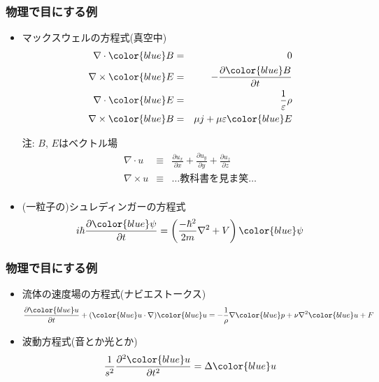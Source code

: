 \documentclass[12pt,dvipdfmx]{beamer}
\newcommand{\ao}[1]{{\color{blue}#1}}
\begin{document}
\begin{frame}
\frametitle{物理で目にする例}
\begin{itemize}
\item マックスウェルの方程式(真空中)
  \begin{eqnarray*}
    \nabla \cdot \ao{B} & = & 0 \\
    \nabla \times \ao{E} & = & -\frac{\partial \ao{B}}{\partial t} \\
    \nabla \cdot \ao{E} & = & \frac{1}{\varepsilon}\rho \\
    \nabla \times \ao{B} & = & \mu j + \mu\varepsilon \ao{E} \\
  \end{eqnarray*}

注: $B$, $E$は\ao{ベクトル}場
  \begin{eqnarray*}
\nabla \cdot u & \equiv & \frac{\partial u_x}{\partial x}
+ \frac{\partial u_y}{\partial y}
+ \frac{\partial u_z}{\partial z} \\
\nabla \times u & \equiv & \ldots \mbox{教科書を見ま笑} \ldots \\
  \end{eqnarray*}
  
\item (一粒子の)シュレディンガーの方程式
\[ i\hbar \frac{\partial\ao{\psi}}{\partial t} 
= \left(\frac{-\hbar^2}{2m}\nabla^2 + V \right)\ao{\psi} \]
\end{itemize}

\end{frame}

\begin{frame}
\frametitle{物理で目にする例}
\begin{itemize}
\item 流体の速度場の方程式(ナビエストークス)
\[ 
\frac{\partial \ao{u}}{\partial t} + (\ao{u} \cdot \nabla)\ao{u}
= -\frac{1}{\rho} \nabla \ao{p} + \nu \nabla^2 \ao{u} + F
\]

\item 波動方程式(音とか光とか)
\[ \frac{1}{s^2} \frac{\partial^2 \ao{u}}{\partial t^2} = \Delta \ao{u} \] 

\end{itemize}
\end{frame}
\end{document}
